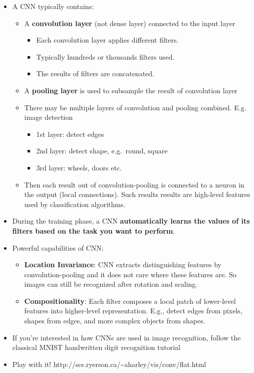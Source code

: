 \documentclass[11pt]{article}
\providecommand{\tightlist}{%
      \setlength{\itemsep}{0pt}\setlength{\parskip}{0pt}}
\begin{document}
\begin{itemize}
\tightlist
\item
  A CNN typically contains:

  \begin{itemize}
  \tightlist
  \item
    A \textbf{convolution layer} (not dense layer) connected to the
    input layer

    \begin{itemize}
    \tightlist
    \item
      Each convolution layer applies different filters.
    \item
      Typically hundreds or thousands filters used.
    \item
      The results of filters are concatenated.
    \end{itemize}
  \item
    A \textbf{pooling layer} is used to subsample the result of
    convolution layer
  \item
    There may be multiple layers of convolution and pooling combined.
    E.g. image detection

    \begin{itemize}
    \tightlist
    \item
      1st layer: detect edges
    \item
      2nd layer: detect shape, e.g.~round, square
    \item
      3rd layer: wheels, doors etc.
    \end{itemize}
  \item
    Then each result out of convolution-pooling is connected to a neuron
    in the output (local connections). Such results results are
    high-level features used by classification algorithms.
  \end{itemize}
\item
  During the training phase, a CNN \textbf{automatically learns the
  values of its filters based on the task you want to perform}.
\item
  Powerful capabilities of CNN:

  \begin{itemize}
  \tightlist
  \item
    \textbf{Location Invariance}: CNN extracts distinguishing features
    by convolution-pooling and it does not care where these features
    are. So images can still be recognized after rotation and scaling.
  \item
    \textbf{Compositionality}: Each filter composes a local patch of
    lower-level features into higher-level representation. E.g., detect
    edges from pixels, shapes from edges, and more complex objects from
    shapes.
  \end{itemize}
\item
  If you're interested in how CNNs are used in image recognition, follow
  the classical MNIST handwritten digit recognition tutorial
\item
  Play with it!
  http://scs.ryerson.ca/\textasciitilde{}aharley/vis/conv/flat.html
\end{itemize}
\end{document}

